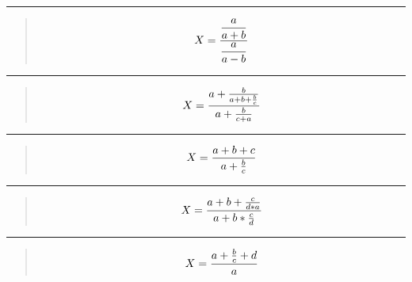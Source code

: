\documentclass[letterpaper,10pt,spanish]{sphinxmanual}
\begin{document}
\begin{enumerate}
\bigskip\hrule\bigskip


\sphinxAtStartPar
{}
\begin{quote}
\begin{equation*}
\begin{split} X = {\dfrac{a}{a + b} \over \dfrac{a}{a - b}}  \end{split}
\end{equation*}\end{quote}


\bigskip\hrule\bigskip


\sphinxAtStartPar
{}
\begin{quote}
\begin{equation*}
\begin{split} X = {  a + { b \over a + b + { b \over c }  } \over a + { b \over c + a } } \end{split}
\end{equation*}\end{quote}


\bigskip\hrule\bigskip


\sphinxAtStartPar
{}
\begin{quote}
\begin{equation*}
\begin{split} X = { a + b + c \over a + { b \over c } } \end{split}
\end{equation*}\end{quote}


\bigskip\hrule\bigskip


\sphinxAtStartPar
{}
\begin{quote}
\begin{equation*}
\begin{split} X = { a + b + { c \over d * a } \over a + b * {c \over d} } \end{split}
\end{equation*}\end{quote}


\bigskip\hrule\bigskip


\sphinxAtStartPar
{}
\begin{quote}
\begin{equation*}
\begin{split} X = { a + { b \over c } + d \over a } \end{split}
\end{equation*}\end{quote}



\end{enumerate}
\end{document}
